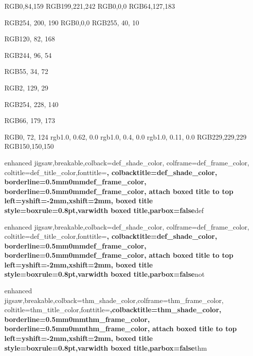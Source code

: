 
\definecolor{def_color}			{RGB}{0,84,159}
\definecolor{def_shade_color}	{RGB}{199,221,242}
\definecolor{def_title_color}	{RGB}{0,0,0}
\definecolor{def_frame_color}	{RGB}{64,127,183}


\definecolor{thm_shade_color}	{RGB}{254, 200, 190}
\definecolor{thm_title_color}	{RGB}{0,0,0}
\definecolor{thm_frame_color}	{RGB}{255, 40, 10}


\definecolor{Corollary_color}   {RGB}{120, 82, 168}

\definecolor{Remark_color}      {RGB}{244, 96, 54}

\definecolor{AltTheorem_color}  {RGB}{55, 34, 72}

\definecolor{Example_color}     {RGB}{2, 129, 29}

\definecolor{Lemma_color}       {RGB}{254, 228, 140}

\definecolor{Proposition_color} {RGB}{66, 179, 173}

\definecolor{indigo_dye}        {RGB}{0, 72, 124}
\definecolor{orangepeel}        {rgb}{1.0, 0.62, 0.0}
\definecolor{blazeorange}       {rgb}{1.0, 0.4, 0.0}
\definecolor{ferrarired}        {rgb}{1.0, 0.11, 0.0}
\definecolor{fouriergray}       {RGB}{229,229,229}
\definecolor{darkfouriergray}       {RGB}{150,150,150}



{enhanced jigsaw,breakable,colback=def_shade_color, colframe=def_frame_color,
coltitle=def_title_color,fonttitle=\bfseries, colbacktitle=def_shade_color,
borderline={0.5mm}{0mm}{def_frame_color},
borderline={0.5mm}{0mm}{def_frame_color},
attach boxed title to top left={yshift=-2mm,xshift=2mm},
boxed title style={boxrule=0.8pt},varwidth boxed title,parbox=false}{def}


{enhanced jigsaw,breakable,colback=def_shade_color, colframe=def_frame_color,
coltitle=def_title_color,fonttitle=\bfseries, colbacktitle=def_shade_color,
borderline={0.5mm}{0mm}{def_frame_color},
borderline={0.5mm}{0mm}{def_frame_color},
attach boxed title to top left={yshift=-2mm,xshift=2mm},
boxed title style={boxrule=0.8pt},varwidth boxed title,parbox=false}{not}


{enhanced jigsaw,breakable,colback=thm_shade_color,colframe=thm_frame_color,
coltitle=thm_title_color,fonttitle=\bfseries ,colbacktitle=thm_shade_color,
borderline={0.5mm}{0mm}{thm_frame_color},
borderline={0.5mm}{0mm}{thm_frame_color},
attach boxed title to top left={yshift=-2mm,xshift=2mm},
boxed title style={boxrule=0.8pt},varwidth boxed title,parbox=false}{thm}



